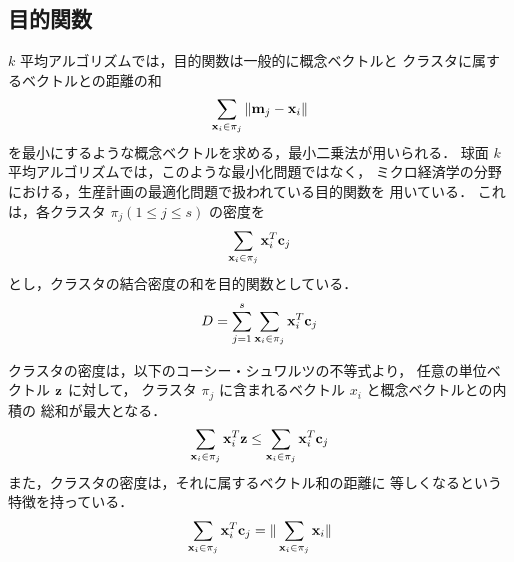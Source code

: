 \subsection{目的関数} \label{moku}
$k$ 平均アルゴリズムでは，目的関数は一般的に概念ベクトルと
クラスタに属するベクトルとの距離の和
\begin{equation}
\sum_{{\bf x}_i \in \pi_j} \| {\bf m}_j - {\bf x}_i \|
\end{equation}
を最小にするような概念ベクトルを求める，最小二乗法が用いられる．
球面 $k$ 平均アルゴリズムでは，このような最小化問題ではなく，
ミクロ経済学の分野における，生産計画の最適化問題で扱われている目的関数を
用いている\cite{Kleinberg}．
これは，各クラスタ $\pi_{j} (1 \leq j \leq s)$ の密度を
\begin{equation}
\sum_{{\bf x}_i \in \pi_j} {\bf x}_i^T {\bf c}_j
\end{equation}
とし，クラスタの結合密度の和を目的関数としている．
\begin{equation}
D = \sum_{j =1}^{s} \sum_{{\bf x}_i \in \pi_j} {\bf x}_i^T {\bf c}_j
\end{equation}

クラスタの密度は，以下のコーシー・シュワルツの不等式より，
任意の単位ベクトル ${\bf z}$ に対して，
クラスタ $\pi_j$ に含まれるベクトル $x_i$ と概念ベクトルとの内積の
総和が最大となる．
\begin{equation}
\sum_{{\bf x}_i \in \pi_j} {\bf x}_i^T {\bf z} \leq 
\sum_{{\bf x}_i \in \pi_j} {\bf x}_i^T {\bf c}_j
\end{equation}
また，クラスタの密度は，それに属するベクトル和の距離に
等しくなるという特徴を持っている．
\begin{equation}
\sum_{{\bf x}_i \in \pi_j} {\bf x}_i^T {\bf c}_j = 
\| \sum_{{\bf x}_i \in \pi_j} {\bf x}_i \|
\end{equation}

